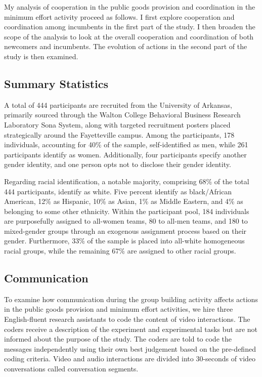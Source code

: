 My analysis of cooperation in the public goods provision and coordination in the minimum effort activity proceed as follows. I first explore cooperation and coordination among incumbents in the first part of the study. I then broaden the scope of the analysis to look at the overall cooperation and coordination of both newcomers and incumbents. The evolution of actions in the second part of the study is then examined.

\subsection{Summary Statistics}
A total of 444 participants are recruited from the University of Arkansas, primarily sourced through the Walton College Behavioral Business Research Laboratory Sona System, along with targeted recruitment posters placed strategically around the Fayetteville campus. Among the participants, 178 individuals, accounting for 40\% of the sample, self-identified as men, while 261 participants identify as women. Additionally, four participants specify another gender identity, and one person opts not to disclose their gender identity.

Regarding racial identification, a notable majority, comprising 68\% of the total 444 participants, identify as white. Five percent identify as black/African American, 12\% as Hispanic, 10\% as Asian, 1\% as Middle Eastern, and 4\% as belonging to some other ethnicity. Within the participant pool, 184 individuals are purposefully assigned to all-women teams, 80 to all-men teams, and 180 to mixed-gender groups through an exogenous assignment process based on their gender. Furthermore, 33\% of the sample is placed into all-white homogeneous racial groups, while the remaining 67\% are assigned to other racial groups.


\subsection{Communication}
To examine how communication during the group building activity affects actions in the  public goods provision and minimum effort activities, we hire three English-fluent research assistants to code the content of video interactions. The coders receive a description of the experiment and experimental tasks but are not informed about the purpose of the study. The coders are told to code the messages independently using their own best judgement based on the pre-defined coding criteria. Video and audio interactions are divided into 30-seconds of video conversations called conversation segments. 

